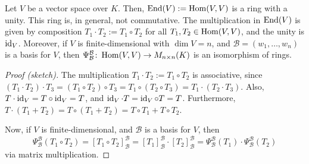 \begin{corollary}
  Let $V$ be a vector space over $K$. Then, $\operatorname{End}(V) := \operatorname{Hom}(V,V)$ is a ring with a unity. This ring is, in general, not commutative. The multiplication in $\operatorname{End}(V)$ is given by composition $T_1 \cdot T_2 := T_1 \circ T_2$ for all $T_1, T_2 \in \operatorname{Hom}(V,V)$, and the unity is $\operatorname{id}_V$. Moreover, if $V$ is finite-dimensional with $\dim V = n$, and $\mathcal{B} = (w_1, \dots, w_n)$ is a basis for $V$, then $\Psi_{\mathcal{B}}^{\mathcal{B}} \colon \operatorname{Hom}(V,V) \to M_{n \times n}(K)$ is an isomorphism of rings.
\end{corollary}

\begin{proof}[Proof (sketch)]
  The multiplication $T_1 \cdot T_2 := T_1 \circ T_2$ is associative, since $(T_1 \cdot T_2) \cdot T_3 = (T_1 \circ T_2) \circ T_3 = T_1 \circ (T_2 \circ T_3) = T_1 \cdot (T_2 \cdot T_3)$. Also, $T \cdot \operatorname{id}_V = T \circ \operatorname{id}_V = T$, and $\operatorname{id}_V \cdot T = \operatorname{id}_V \circ T = T$. Furthermore, $T \cdot (T_1 + T_2) = T \circ (T_1 + T_2) = T \circ T_1 + T \circ T_2$.

  Now, if $V$ is finite-dimensional, and $\mathcal{B}$ is a basis for $V$, then
  $$\Psi_{\mathcal{B}}^{\mathcal{B}}(T_1 \circ T_2) = [T_1 \circ T_2]_{\mathcal{B}}^{\mathcal{B}} = [T_1]_{\mathcal{B}}^{\mathcal{B}} \cdot [T_2]_{\mathcal{B}}^{\mathcal{B}} = \Psi_{\mathcal{B}}^{\mathcal{B}}(T_1) \cdot \Psi_{\mathcal{B}}^{\mathcal{B}}(T_2)$$
  via matrix multiplication.
\end{proof}
